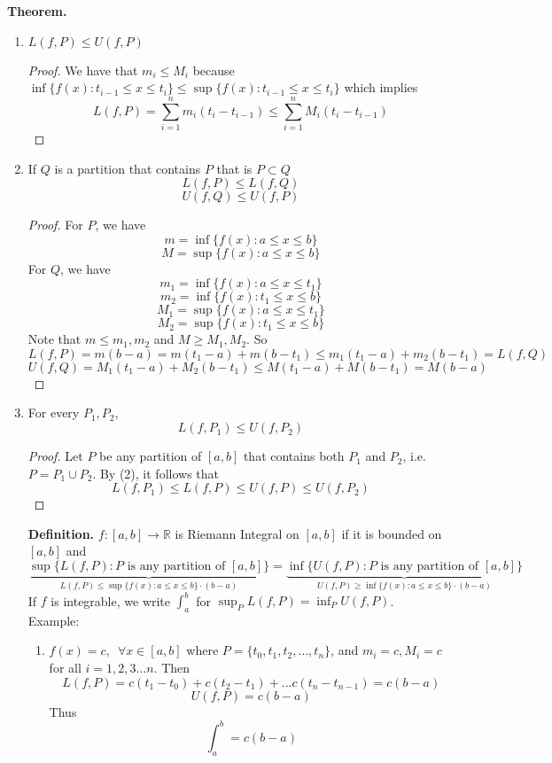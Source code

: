\documentclass[10pt,letterpaper]{article}
\begin{document}
	\textbf{{\color{green}Theorem. }} 
	\begin{enumerate}[(1)]
		\item $L(f, P) \leq U(f, P)$
		\begin{proof}
			We have that $m_i \leq M_i$ because
			$\inf\{f(x) : t_{i-1} \leq x \leq t_i\} \leq \sup\{f(x) : t_{i-1} \leq x \leq t_{i}\}$
			which implies
	$$L(f, P) = \displaystyle\sum_{i=1}^{n} m_i(t_i - t_{i-1}) \leq 
	\sum_{i=1}^{n} M_i(t_i - t_{i-1})$$
		\end{proof}
		\item If $Q$ is a partition that contains $P$ that is $P \subset Q$
		$$L(f, P) \leq L(f, Q)$$
		$$U(f, Q) \leq U(f, P)$$
		\begin{proof}
			For $P$, we have
			$$m = \inf\{f(x) : a \leq x \leq b\}$$
			$$M = \sup\{f(x) : a \leq x \leq b\}$$
			For $Q$, we have
			$$m_1 = \inf\{f(x) : a \leq x \leq t_1\}$$
			$$m_2 = \inf\{f(x) : t_1 \leq x \leq b\}$$
			$$M_1 = \sup\{f(x) : a \leq x \leq t_1\}$$
			$$M_2 = \sup\{f(x) : t_1 \leq x \leq b\}$$
			Note that $m \leq m_1, m_2$ and $M \geq M_1, M_2$. So
			$$L(f, P) = m(b - a) = m(t_1 - a) + m(b - t_1) 
			\leq m_1(t_1 - a) + m_2(b - t_1) = L(f, Q)$$
			$$U(f, Q) = M_1(t_1 - a) + M_2(b - t_1) \leq M(t_1 - a) + M(b - t_1)
			= M(b - a)$$
		\end{proof}
		\item For every $P_1, P_2$, 
		$$L(f, P_1) \leq U(f, P_2)$$
		\begin{proof}
		Let $P$ be any partition of $[a, b]$ that contains both $P_1$ and $P_2$, i.e.
		$P = P_1 \cup P_2$. By (2), it follows that
		$$L(f, P_1) \leq L(f, P) \leq U(f, P) \leq U(f, P_2)$$
		\end{proof}
		
		\textbf{Definition. } $f: [a, b] \rightarrow \mathbb{R}$ is Riemann Integral
		on $[a, b]$ if it is bounded on $[a, b]$ and 
		$$
		\underbrace{\sup\{L(f, P) : P \text{ is any partition of } [a, b]\}}_
		{L(f, P) \leq \sup\{f(x) : a \leq x \leq b\} \cdot (b - a)}
		= 
		\underbrace{\inf\{U(f, P) : P \text{ is any partition of } [a, b]\}}_
		{U(f, P) \geq \inf\{f(x) : a \leq x \leq b\} \cdot (b - a)}$$
		If $f$ is integrable, we write $\displaystyle\int_{a}^{b}$ for
		$\sup_P L(f, P) = \inf_P U(f, P)$. \\
		
		Example: \\
		\begin{enumerate}[(1)]
		\item $f(x) = c, \, \, \, \forall x \in [a, b]$
		where $P = \{t_0, t_1, t_2, \ldots, t_n\}$, and $m_i = c, M_i = c$ for all $i = 1, 2, 3 \ldots n$.
		Then
		$$L(f, P) = c(t_1 - t_0) + c(t_2 - t_1) + \ldots c(t_n - t_{n-1}) = c(b - a)$$
		$$U(f, P) = c(b - a)$$
		Thus
		$$\displaystyle\int_{a}^{b} = c(b - a)$$
		

\end{enumerate}
\end{enumerate}
\end{document}

